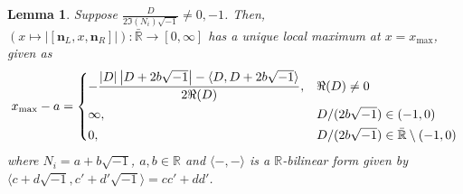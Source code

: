 \documentclass{article}
\theoremstyle{definition}
\theoremstyle{plain}
\newtheorem{lemma}{Lemma}
\theoremstyle{remark}
\numberwithin{equation}{section}
\newcommand{\bR}{\mathbb{R}}
\newcommand{\abs}[1]{\left| {#1} \right|}
\newcommand{\inprod}[2]{\langle {#1}, {#2} \rangle}
\newcommand{\im}{{\sqrt{-1}}}
\def\nsL{{\mathbf{n}_L}}
\def\nsR{{\mathbf{n}_R}}
\begin{document}
\begin{lemma}\label{maximal case estimate}
  Suppose $\frac{D}{2 \Im(N_i) \im} \neq 0, -1$.
  Then, $(x \mapsto \abs{[\nsL, x, \nsR]}) : \bar{\bR} \to [0, \infty]$ has a unique local maximum at $x = x_{\max}$, given as
  \begin{equation*}
    x_{\max} - a = \begin{dcases}
      - \frac{\abs{D} \abs{D + 2b \im} - \inprod{D}{D + 2b \im}}{2 \Re(D)}, & \Re(D) \neq 0 \\
      \infty, & D / (2b \im) \in (-1, 0) \\
      0, & D / (2b \im) \in \bar{\bR} \setminus (-1, 0)
    \end{dcases}
  \end{equation*}
  where $N_i = a + b \im$, $a, b \in \bR$
  and $\inprod{-}{-}$ is a $\bR$-bilinear form given by $\inprod{c + d \im}{c' + d' \im} = cc' + dd'$.
\end{lemma}
\end{document}

